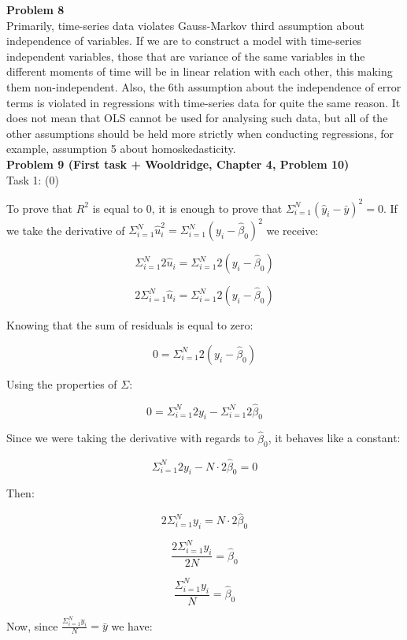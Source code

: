 \documentclass{article}
\begin{document}
\textbf{Problem 8}
\\

Primarily, time-series data violates Gauss-Markov third assumption about independence of variables. If we are to construct a model with time-series independent variables, those that are variance of the same variables in the different moments of time will be in linear relation with each other, this making them non-independent. Also, the 6th assumption about the independence of error terms is violated in regressions with time-series data for quite the same reason. It does not mean that OLS cannot be used for analysing such data, but all of the other assumptions should be held more strictly when conducting regressions, for example, assumption 5 about homoskedasticity. 
\\

\textbf{Problem 9 (First task + Wooldridge, Chapter 4, Problem 10)}
\\

Task 1:
(0)
 
To prove that $R^2$ is equal to 0, it is enough to prove that $\Sigma^{N}_{i=1} (\hat{y}_{i} - \bar{y})^2 = 0$. If we take the derivative of $\Sigma^{N}_{i=1}\hat{u}_{i}^2 = \Sigma^{N}_{i=1} (y_{i} - \hat{\beta}_{0})^2$ we receive:

$$\Sigma^{N}_{i=1}2\hat{u}_i = \Sigma^{N}_{i=1} 2(y_{i} - \hat{\beta}_{0})$$

$$2\Sigma^{N}_{i=1}\hat{u}_i = \Sigma^{N}_{i=1} 2(y_{i} - \hat{\beta}_{0})$$

Knowing that the sum of residuals is equal to zero:

$$0 = \Sigma^{N}_{i=1} 2(y_{i} - \hat{\beta}_{0})$$

Using the properties of $\Sigma$:

$$0 = \Sigma^{N}_{i=1} 2y_{i} - \Sigma^{N}_{i=1}2\hat{\beta}_{0}$$

Since we were taking the derivative with regards to $\hat{\beta}_0$, it behaves like a constant:

$$\Sigma^{N}_{i=1} 2y_{i} - N\cdot 2\hat{\beta}_{0} = 0$$

Then:

$$2\Sigma^{N}_{i=1} y_{i} = N\cdot 2\hat{\beta}_{0}$$

$$\frac{2\Sigma^{N}_{i=1} y_{i}}{2N} = \hat{\beta}_{0}$$

$$\frac{\Sigma^{N}_{i=1} y_{i}}{N} = \hat{\beta}_{0}$$

Now, since $\frac{\Sigma^{N}_{i=1} y_{i}}{N} = \bar{y}$ we have:
\end{document}
